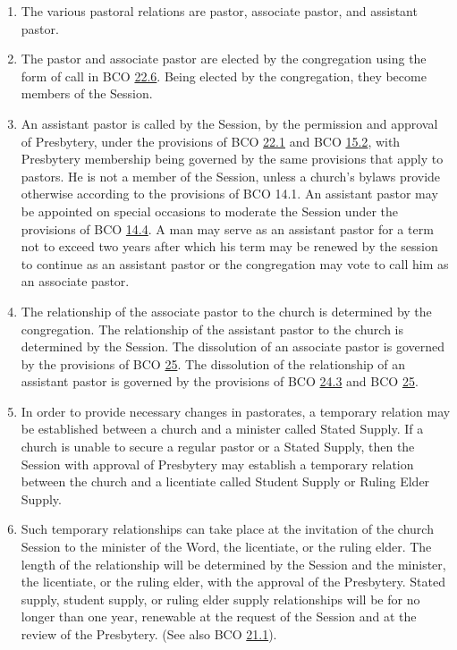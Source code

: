 \documentclass[
]{book}
\providecommand{\tightlist}{%
  \setlength{\itemsep}{0pt}\setlength{\parskip}{0pt}}
\begin{document}
\protect\hypertarget{chapter-slug-24-the-pastoral-relations}{\href{}{}}

\begin{enumerate}
\def\labelenumi{\arabic{enumi}.}
\tightlist
\item
  \protect\hypertarget{24}{\href{}{}}The various pastoral relations are pastor, associate pastor, and assistant pastor.
\item
  The pastor and associate pastor are elected by the congregation using the form of call in BCO \protect\hyperlink{22.6}{22.6}. Being elected by the congregation, they become members of the Session.
\item
  \protect\hypertarget{24.3}{\href{}{}}An assistant pastor is called by the Session, by the permission and approval of Presbytery, under the provisions of BCO \protect\hyperlink{22.1}{22.1} and BCO \protect\hyperlink{15.2}{15.2}, with Presbytery membership being governed by the same provisions that apply to pastors. He is not a member of the Session, unless a church's bylaws provide otherwise according to the provisions of BCO 14.1. An assistant pastor may be appointed on special occasions to moderate the Session under the provisions of BCO \protect\hyperlink{14.4}{14.4}. A man may serve as an assistant pastor for a term not to exceed two years after which his term may be renewed by the session to continue as an assistant pastor or the congregation may vote to call him as an associate pastor.
\item
  The relationship of the associate pastor to the church is determined by the congregation. The relationship of the assistant pastor to the church is determined by the Session. The dissolution of an associate pastor is governed by the provisions of BCO \protect\hyperlink{25}{25}. The dissolution of the relationship of an assistant pastor is governed by the provisions of BCO \protect\hyperlink{24.3}{24.3} and BCO \protect\hyperlink{25}{25}.
\item
  \protect\hypertarget{24.5}{\href{}{}}In order to provide necessary changes in pastorates, a temporary relation may be established between a church and a minister called Stated Supply. If a church is unable to secure a regular pastor or a Stated Supply, then the Session with approval of Presbytery may establish a temporary relation between the church and a licentiate called Student Supply or Ruling Elder Supply.
\item
  \protect\hypertarget{24.6}{\href{}{}}Such temporary relationships can take place at the invitation of the church Session to the minister of the Word, the licentiate, or the ruling elder. The length of the relationship will be determined by the Session and the minister, the licentiate, or the ruling elder, with the approval of the Presbytery. Stated supply, student supply, or ruling elder supply relationships will be for no longer than one year, renewable at the request of the Session and at the review of the Presbytery. (See also BCO \protect\hyperlink{21.1}{21.1}).
\end{enumerate}
\end{document}

